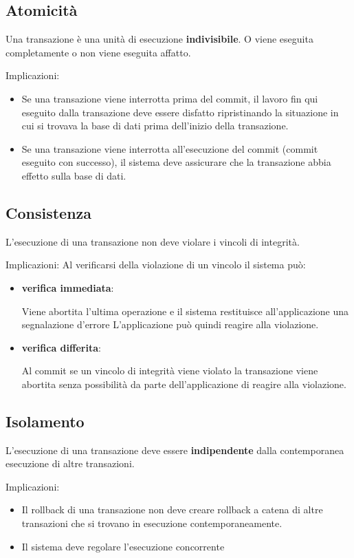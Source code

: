 \documentclass[a4paper, 10pt]{article}
\theoremstyle{definition}
\begin{document}
	\newpage
	
	\subsection{Atomicità}
	Una transazione è una unità di esecuzione \textbf{indivisibile}. O viene
	eseguita completamente o non viene eseguita affatto.
	
	Implicazioni:
	\begin{itemize}
		\item Se una transazione viene interrotta prima del commit, il lavoro fin
		qui eseguito dalla transazione deve essere disfatto ripristinando la
		situazione in cui si trovava la base di dati prima dell'inizio della
		transazione.
		\item Se una transazione viene interrotta all'esecuzione del commit
		(commit eseguito con successo), il sistema deve assicurare che la
		transazione abbia effetto sulla base di dati.
	\end{itemize}
	
	\subsection{Consistenza}
	L'esecuzione di una transazione non deve violare i vincoli di integrità.
	
	Implicazioni:
	Al verificarsi della violazione di un vincolo il sistema può:
	\begin{itemize}
		\item \textbf{verifica immediata}:
		
			Viene abortita l'ultima operazione e il sistema restituisce
			all'applicazione una segnalazione d'errore
			L'applicazione può quindi reagire alla violazione.
		\item \textbf{verifica differita}:
		
			Al commit se un vincolo di integrità viene violato la transazione
			viene abortita senza possibilità da parte dell'applicazione di
			reagire alla violazione.
	\end{itemize}
	
	\subsection{Isolamento}
	L'esecuzione di una transazione deve essere \textbf{indipendente} dalla
	contemporanea esecuzione di altre transazioni.
	
	Implicazioni:
	\begin{itemize}
		\item Il rollback di una transazione non deve creare rollback a catena di
		altre transazioni che si trovano in esecuzione contemporaneamente.
		\item Il sistema deve regolare l'esecuzione concorrente
	\end{itemize}
	
\end{document}
